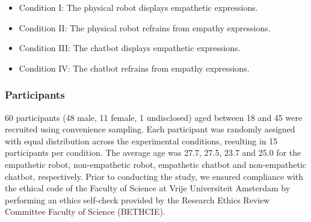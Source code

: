 \documentclass[runningheads]{llncs}
\begin{document}
\begin{itemize}\small
    \item Condition I: The physical robot displays empathetic expressions.
    \item Condition II: The physical robot refrains from empathy expressions.
    \item Condition III: The chatbot displays empathetic expressions.
    \item Condition IV: The chatbot refrains from empathy expressions.
\end{itemize}

\vspace{-1em}

\subsubsection{Participants}
60 participants (48 male, 11 female, 1 undisclosed) aged between 18 and 45 were recruited using convenience sampling. Each participant was randomly assigned with equal distribution across the experimental conditions, resulting in 15 participants per condition. The average age was 27.7, 27.5, 23.7 and 25.0 for the empathetic robot, non-empathetic robot, empathetic chatbot and non-empathetic chatbot, respectively. Prior to conducting the study, we ensured compliance with the ethical code of the Faculty of Science at Vrije Universiteit Amsterdam by performing an ethics self-check provided by the Research Ethics Review Committee Faculty of Science (BETHCIE).
\end{document}
